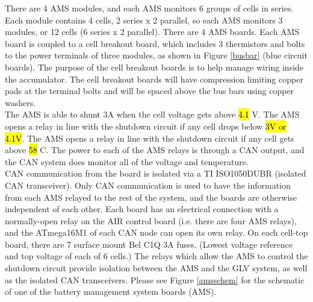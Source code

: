 \documentclass{article}
\DeclareRobustCommand{\hlr}[1]{{\sethlcolor{red}\hl{#1}}}
\begin{document}

           There are 4 AMS modules, and each AMS monitors 6 groups of cells in series. Each module contains 4 cells, 2 series x 2 parallel, so each AMS monitors 3 modules, or 12 cells (6 series x 2 parallel). There are 4 AMS boards. Each AMS board is coupled to a cell breakout board, which includes 3 thermistors and bolts to the power terminals of three modules, as shown in Figure \ref{busbar} (blue circuit boards). The purpose of the cell breakout boards is to help manage wiring inside the accumulator. The cell breakout boards will have compression limiting copper pads at the terminal bolts and will be spaced above the bus bars using copper washers.\\

            The AMS is able to shunt 3A when the cell voltage gets above \hlr{4.1} V. The AMS opens a relay in line with the shutdown circuit if any cell drops below \hlr{3V or 4.1V}. The AMS opens a relay in line with the shutdown circuit if any cell gets above \hlr{58} \degree C. The power to each of the AMS relays is through a CAN output, and the CAN system does monitor all of the voltage and temperature.\\

            CAN communication from the board is isolated via a TI ISO1050DUBR (isolated CAN transceiver). Only CAN communication is used to have the information from each AMS relayed to the rest of the system, and the boards are otherwise independent of each other. Each board has an electrical connection with a normally-open relay on the AIR control board (i.e. there are four AMS relays), and the ATmega16M1 of each CAN node can open its own relay. On each cell-top board, there are 7 surface mount Bel C1Q 3A fuses. (Lowest voltage reference and top voltage of each of 6 cells.) The relays which allow the AMS to control the shutdown circuit provide isolation between the AMS and the GLV system, as well as the isolated CAN transceivers. Please see Figure \ref{amsschem} for the schematic of one of the battery management system boards (AMS).\\

\end{document}
